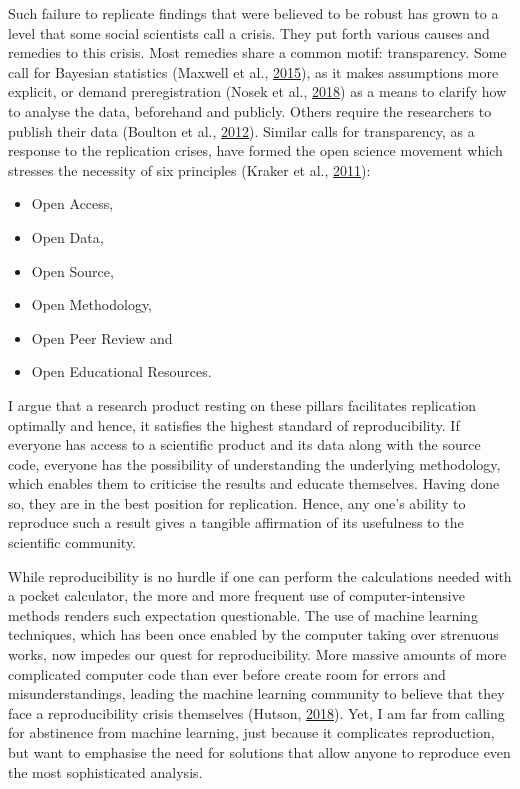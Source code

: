 \documentclass[12pt,a4paper,]{article}
\providecommand{\tightlist}{%
  \setlength{\itemsep}{0pt}\setlength{\parskip}{0pt}}
\begin{document}
Such failure to replicate findings that were believed to be robust has grown to a level that some social scientists call a crisis.
They put forth various causes and remedies to this crisis.
Most remedies share a common motif: transparency.
Some call for Bayesian statistics (Maxwell et al., \protect\hyperlink{ref-maxwellPsychologySufferingReplication2015}{2015}), as it makes assumptions more explicit, or demand preregistration (Nosek et al., \protect\hyperlink{ref-nosekPreregistrationRevolution2018}{2018}) as a means to clarify how to analyse the data, beforehand and publicly. Others require the researchers to publish their data (Boulton et al., \protect\hyperlink{ref-boultonScienceOpenEnterprise2012}{2012}).
Similar calls for transparency, as a response to the replication crises, have formed the open science movement which stresses the necessity of six principles (Kraker et al., \protect\hyperlink{ref-krakerCaseOpenScience2011}{2011}):

\begin{itemize}
\tightlist
\item
  Open Access,
\item
  Open Data,
\item
  Open Source,
\item
  Open Methodology,
\item
  Open Peer Review and
\item
  Open Educational Resources.
\end{itemize}

I argue that a research product resting on these pillars facilitates replication optimally and hence, it satisfies the highest standard of reproducibility.
If everyone has access to a scientific product and its data along with the source code, everyone has the possibility of understanding the underlying methodology, which enables them to criticise the results and educate themselves.
Having done so, they are in the best position for replication.
Hence, any one's ability to reproduce such a result gives a tangible affirmation of its usefulness to the scientific community.

While reproducibility is no hurdle if one can perform the calculations needed with a pocket calculator, the more and more frequent use of computer-intensive methods renders such expectation questionable.
The use of machine learning techniques, which has been once enabled by the computer taking over strenuous works, now impedes our quest for reproducibility.
More massive amounts of more complicated computer code than ever before create room for errors and misunderstandings, leading the machine learning community to believe that they face a reproducibility crisis themselves (Hutson, \protect\hyperlink{ref-hutsonArtificialIntelligenceFaces2018}{2018}).
Yet, I am far from calling for abstinence from machine learning, just because it complicates reproduction, but want to emphasise the need for solutions that allow anyone to reproduce even the most sophisticated analysis.
\end{document}
